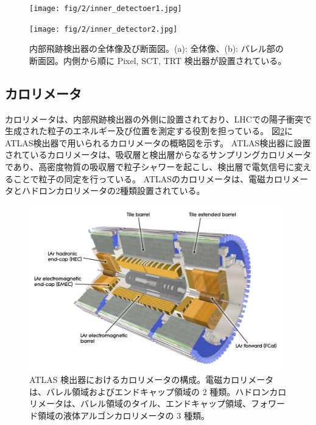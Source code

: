 \begin{figure}
    \centering
    \begin{minipage}[b]{0.4\linewidth}
        \centering
        \texttt{[image: fig/2/inner\_detectoer1.jpg]}
        \vspace{10pt}
        \subcaption{}
        \label{fig:内部飛跡検出器の概略図1}
    \end{minipage}
    \hfill
    \begin{minipage}[b]{0.5\linewidth}
        \centering
        \texttt{[image: fig/2/inner\_detector2.jpg]}
        \vspace{10pt}
        \subcaption{}
        \label{fig:内部飛跡検出器の概略図2}
    \end{minipage}
    \caption{内部飛跡検出器の全体像及び断面図。(a): 全体像、(b): バレル部の断面図。内側から順に Pixel, SCT, TRT 検出器が設置されている。}
    \label{fig:内部飛跡検出器}
\end{figure}



\subsection{カロリメータ}
カロリメータは、内部飛跡検出器の外側に設置されており、LHCでの陽子衝突で生成された粒子のエネルギー及び位置を測定する役割を担っている。
図\ref{fig:カロリメータ}にATLAS検出器で用いられるカロリメータの概略図を示す。
ATLAS検出器に設置されているカロリメータは、吸収層と検出層からなるサンプリングカロリメータであり、高密度物質の吸収層で粒子シャワーを起こし、検出層で電気信号に変えることで粒子の同定を行っている。
ATLASのカロリメータは、電磁カロリメータとハドロンカロリメータの2種類設置されている。

\begin{figure}[tb]
  \centering
  \includegraphics[clip, width=11cm]{fig/2/Calorimeter_d3.pdf}
  \caption{ATLAS 検出器におけるカロリメータの構成。電磁カロリメータは、バレル領域およびエンドキャップ領域の 2 種類。ハドロンカロリメータは、バレル領域のタイル、エンドキャップ領域、フォワード領域の液体アルゴンカロリメータの 3 種類。}
  \label{fig:カロリメータ}
\end{figure}

